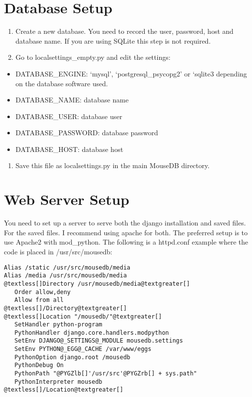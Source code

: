 \documentclass[letterpaper,10pt,english]{sphinxmanual}
\begin{document}
\section{Database Setup}
\begin{enumerate}
\item {} 
Create a new database.  You need to record the user, password, host and database name.  If you are using SQLite this step is not required.

\item {} 
Go to localsettings\_empty.py and edit the settings:

\end{enumerate}
\begin{itemize}
\item {} 
DATABASE\_ENGINE: `mysql', `postgresql\_psycopg2' or `sqlite3 depending on the database software used.

\item {} 
DATABASE\_NAME: database name

\item {} 
DATABASE\_USER: database user

\item {} 
DATABASE\_PASSWORD: database password

\item {} 
DATABASE\_HOST: database host

\end{itemize}
\begin{enumerate}
\item {} 
Save this file as localsettings.py in the main MouseDB directory.

\end{enumerate}


\section{Web Server Setup}

You need to set up a server to serve both the django installation and saved files.  For the saved files.  I recommend using apache for both.  The preferred setup is to use Apache2 with mod\_python.  The following is a httpd.conf example where the code is placed in /usr/src/mousedb:

\begin{Verbatim}[commandchars=@\[\]]
Alias /static /usr/src/mousedb/media
Alias /media /usr/src/mousedb/media
@textless[]Directory /usr/mousedb/media@textgreater[]
   Order allow,deny
   Allow from all
@textless[]/Directory@textgreater[]
@textless[]Location "/mousedb/"@textgreater[]
   SetHandler python-program
   PythonHandler django.core.handlers.modpython
   SetEnv DJANGO@_SETTINGS@_MODULE mousedb.settings
   SetEnv PYTHON@_EGG@_CACHE /var/www/eggs
   PythonOption django.root /mousedb
   PythonDebug On
   PythonPath "@PYGZlb[]'/usr/src'@PYGZrb[] + sys.path"
   PythonInterpreter mousedb
@textless[]/Location@textgreater[]
\end{Verbatim}
\end{document}
